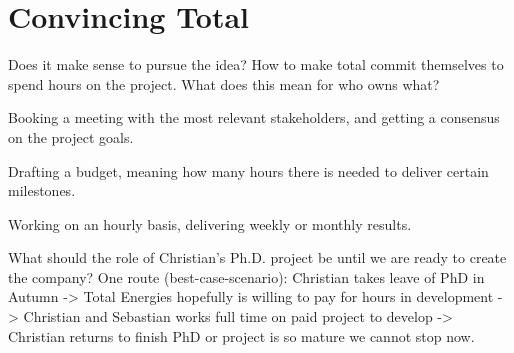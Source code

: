 \documentclass{article}
\begin{document}
\section{Convincing Total}
Does it make sense to pursue the idea?
How to make total commit themselves to spend hours on the project. What does this mean for who owns what?

Booking a meeting with the most relevant stakeholders, and getting a consensus on the project goals.

Drafting a budget, meaning how many hours there is needed to deliver certain milestones.

Working on an hourly basis, delivering weekly or monthly results.

What should the role of Christian's Ph.D. project be until we are ready to create the company?
One route (best-case-scenario): 
Christian takes leave of PhD in Autumn -> Total Energies hopefully is willing to pay for hours in development -> Christian and Sebastian works full time on paid project to develop -> Christian returns to finish PhD or project is so mature we cannot stop now.
\end{document}
